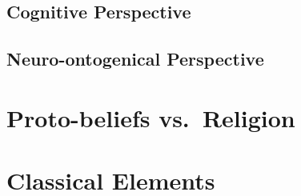 \documentclass[
]{book}
\begin{document}
\hypertarget{cognitive-perspective}{%
\subsection{Cognitive Perspective}\label{cognitive-perspective}}

\hypertarget{neuro-ontogenical-perspective}{%
\subsection{Neuro-ontogenical Perspective}\label{neuro-ontogenical-perspective}}

\hypertarget{proto-beliefs-vs.-religion}{%
\section{Proto-beliefs vs.~Religion}\label{proto-beliefs-vs.-religion}}

\hypertarget{classical-elements}{%
\section{Classical Elements}\label{classical-elements}}

  
\end{document}

